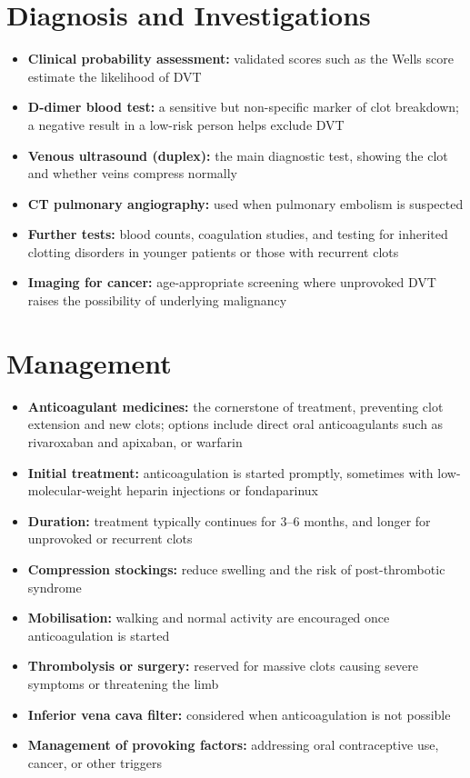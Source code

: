 \section*{Diagnosis and Investigations}
\begin{itemize}
    \item \textbf{Clinical probability assessment:} validated scores such as the Wells score estimate the likelihood of DVT
    \item \textbf{D-dimer blood test:} a sensitive but non-specific marker of clot breakdown; a negative result in a low-risk person helps exclude DVT
    \item \textbf{Venous ultrasound (duplex):} the main diagnostic test, showing the clot and whether veins compress normally
    \item \textbf{CT pulmonary angiography:} used when pulmonary embolism is suspected
    \item \textbf{Further tests:} blood counts, coagulation studies, and testing for inherited clotting disorders in younger patients or those with recurrent clots
    \item \textbf{Imaging for cancer:} age-appropriate screening where unprovoked DVT raises the possibility of underlying malignancy
\end{itemize}

\section*{Management}
\begin{itemize}
    \item \textbf{Anticoagulant medicines:} the cornerstone of treatment, preventing clot extension and new clots; options include direct oral anticoagulants such as rivaroxaban and apixaban, or warfarin
    \item \textbf{Initial treatment:} anticoagulation is started promptly, sometimes with low-molecular-weight heparin injections or fondaparinux
    \item \textbf{Duration:} treatment typically continues for 3--6 months, and longer for unprovoked or recurrent clots
    \item \textbf{Compression stockings:} reduce swelling and the risk of post-thrombotic syndrome
    \item \textbf{Mobilisation:} walking and normal activity are encouraged once anticoagulation is started
    \item \textbf{Thrombolysis or surgery:} reserved for massive clots causing severe symptoms or threatening the limb
    \item \textbf{Inferior vena cava filter:} considered when anticoagulation is not possible
    \item \textbf{Management of provoking factors:} addressing oral contraceptive use, cancer, or other triggers
\end{itemize}

